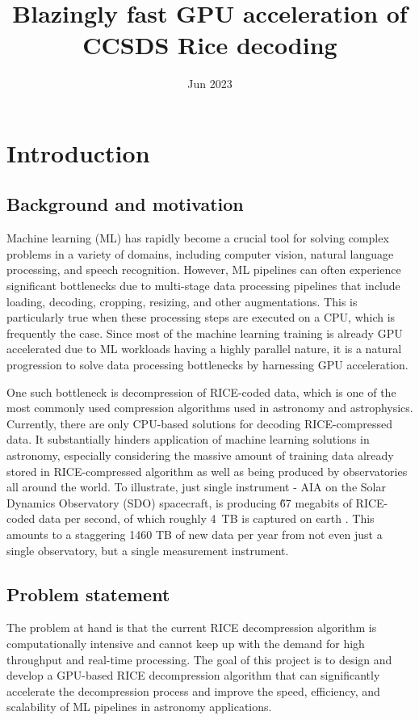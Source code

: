 \documentclass[licencjacka,en]{pracamgr}
\title{Blazingly fast GPU acceleration of CCSDS Rice decoding}
\date{Jun 2023}
\begin{document}
\maketitle

\begin{abstract}
\end{abstract}

\tableofcontents

\chapter{Introduction}
\section{Background and motivation}
Machine learning (ML) has rapidly become a crucial tool for solving complex problems in a variety of domains, including computer vision, natural language processing, and speech recognition. However, ML pipelines can often experience significant bottlenecks due to multi-stage data processing pipelines that include loading, decoding, cropping, resizing, and other augmentations. This is particularly true when these processing steps are executed on a CPU, which is frequently the case. Since most of the machine learning training is already GPU accelerated due to ML workloads having a highly parallel nature, it is a natural progression to solve data processing bottlenecks by harnessing GPU acceleration. 

One such bottleneck is decompression of RICE-coded data, which is one of the most commonly used compression algorithms used in astronomy and astrophysics. Currently, there are only CPU-based solutions for decoding RICE-compressed data. It substantially hinders application of machine learning solutions in astronomy, especially considering the massive amount of training data already stored in RICE-compressed algorithm as well as being produced by observatories all around the world. To illustrate, just single instrument  - AIA on the Solar Dynamics Observatory (SDO) spacecraft, is producing \~67 megabits of RICE-coded data per second, of which roughly 4 TB is captured on earth \cite{sdo-data}. This amounts to a staggering 1460 TB of new data per year from not even just a single observatory, but a single measurement instrument.  

\section{Problem statement}
The problem at hand is that the current RICE decompression algorithm is computationally intensive and cannot keep up with the demand for high throughput and real-time processing. The goal of this project is to design  and develop a GPU-based RICE decompression algorithm that can significantly accelerate the decompression process and improve the speed, efficiency, and scalability of ML pipelines in astronomy applications.
\end{document}

